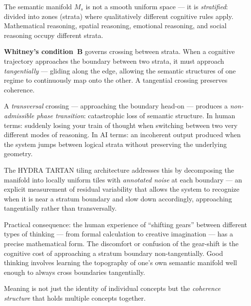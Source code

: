 \begin{tcolorbox}[enhanced, breakable,
  colback=RSVPpurple!8, colframe=RSVPpurple, arc=4pt, boxrule=0.6pt,
  title={\bfseries\sffamily Technical Note: Whitney Stratification and Semantic Phase Transitions},
  coltitle=white, attach boxed title to top left={yshift=-2mm,xshift=6mm},
  boxed title style={colback=RSVPpurple,sharp corners},
  top=4mm,left=4mm,right=4mm,bottom=4mm]

The semantic manifold $M_s$ is not a smooth uniform space — it is
\emph{stratified}: divided into zones (strata) where qualitatively
different cognitive rules apply. Mathematical reasoning, spatial reasoning,
emotional reasoning, and social reasoning occupy different strata.

\textbf{Whitney's condition~B} governs crossing between strata.
When a cognitive trajectory approaches the boundary between two strata,
it must approach \emph{tangentially} — gliding along the edge, allowing
the semantic structures of one regime to continuously map onto the other.
A tangential crossing preserves coherence.

A \emph{transversal} crossing — approaching the boundary head-on — produces
a \emph{non-admissible phase transition}: catastrophic loss of semantic
structure. In human terms: suddenly losing your train of thought when
switching between two very different modes of reasoning. In AI terms:
an incoherent output produced when the system jumps between logical strata
without preserving the underlying geometry.

The HYDRA TARTAN tiling architecture addresses this by decomposing the
manifold into locally uniform tiles with \emph{annotated noise} at each
boundary — an explicit measurement of residual variability that allows the
system to recognize when it is near a stratum boundary and slow down
accordingly, approaching tangentially rather than transversally.

Practical consequence: the human experience of ``shifting gears'' between
different types of thinking — from formal calculation to creative
imagination — has a precise mathematical form. The discomfort or confusion
of the gear-shift is the cognitive cost of approaching a stratum boundary
non-tangentially. Good thinking involves learning the topography of one's
own semantic manifold well enough to always cross boundaries tangentially.
\end{tcolorbox}


Meaning is not just the identity of individual concepts but the
\emph{coherence structure} that holds multiple concepts together.

